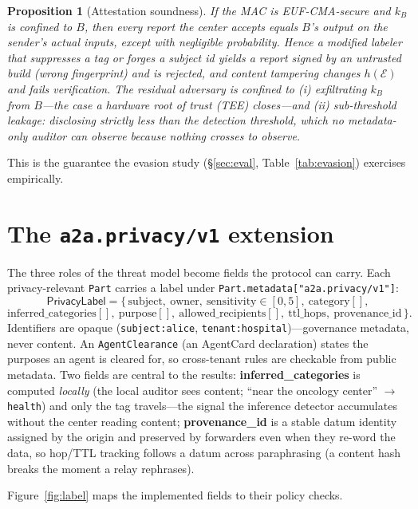 \documentclass{article}
\newtheorem{proposition}{Proposition}
\newcommand{\ext}{\texttt{a2a.privacy/v1}}
\begin{document}
\begin{proposition}[Attestation soundness]\label{prop:attest}
If the MAC is \textup{EUF-CMA}-secure and $k_B$ is confined to $B$, then
every report the center accepts equals $B$'s output on the sender's actual inputs,
except with negligible probability. Hence a modified labeler that suppresses a tag or
forges a subject id yields a report signed by an untrusted build (wrong fingerprint)
and is rejected, and content tampering changes $h(\mathcal{E})$ and fails
verification. The residual adversary is confined to (i) exfiltrating $k_B$ from
$B$---the case a hardware root of trust (TEE) closes---and (ii) \emph{sub-threshold}
leakage: disclosing strictly less than the detection threshold, which no
metadata-only auditor can observe because nothing crosses to observe.
\end{proposition}


\noindent This is the guarantee the evasion study (\S\ref{sec:eval},
Table~\ref{tab:evasion}) exercises empirically.


\section{The \ext{} extension}\label{sec:ext}
The three roles of the threat model become fields the protocol can carry. Each
privacy-relevant \texttt{Part} carries a label under
\texttt{Part.metadata["a2a.privacy/v1"]}:
\[
\textsf{PrivacyLabel} = \{\,
\text{subject},\ \text{owner},\ \text{sensitivity}\!\in\![0,5],\ \text{category}[],
\]
\[
\text{inferred\_categories}[],\ \text{purpose}[],\ \text{allowed\_recipients}[],\
\text{ttl\_hops},\ \text{provenance\_id}\,\}.
\]
Identifiers are opaque (\texttt{subject:alice}, \texttt{tenant:hospital})---governance
metadata, never content. An \texttt{AgentClearance} (an AgentCard declaration)
states the purposes an agent is cleared for, so cross-tenant rules are checkable
from public metadata. Two fields are central to the results:
\textbf{inferred\_categories} is computed \emph{locally} (the local auditor sees
content; ``near the oncology center'' $\rightarrow$ \texttt{health}) and only the
tag travels---the signal the inference detector accumulates without the center
reading content; \textbf{provenance\_id} is a stable datum identity assigned by the
origin and preserved by forwarders even when they re-word the data, so hop/TTL
tracking follows a datum across paraphrasing (a content hash breaks the moment a
relay rephrases).


Figure~\ref{fig:label} maps the implemented fields to their policy checks.

\end{document}
